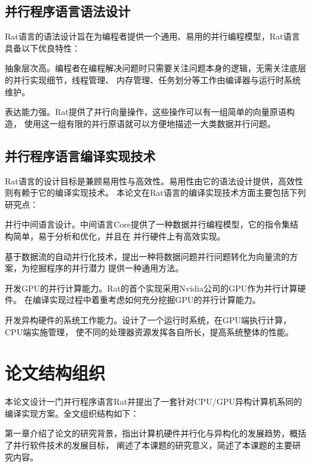 \subsection{并行程序语言语法设计}
Rat语言的语法设计旨在为编程者提供一个通用、易用的并行编程模型，Rat语言具备以下优良特性：
\begin{compactitem}
  \item 抽象层次高。编程者在编程解决问题时只需要关注问题本身的逻辑，无需关注底层的并行实现细节，线程管理、
    内存管理、任务划分等工作由编译器与运行时系统维护。
  \item 表达能力强。Rat提供了并行向量操作，这些操作可以有一组简单的向量原语构造，
    使用这一组有限的并行原语就可以方便地描述一大类数据并行问题。
\end{compactitem}

\subsection{并行程序语言编译实现技术}
Rat语言的设计目标是兼顾易用性与高效性。易用性由它的语法设计提供，高效性则有赖于它的编译实现技术。
本论文在Rat语言的编译实现技术方面主要包括下列研究点：
\begin{compactitem}
  \item 并行中间语言设计。中间语言Core提供了一种数据并行编程模型，它的指令集结构简单，易于分析和优化，并且在
    并行硬件上有高效实现。
  \item 基于数据流的自动并行化技术，提出一种将数据问题并行问题转化为向量流的方案，为挖掘程序的并行潜力
    提供一种通用方法。
  \item 开发GPU的并行计算能力。Rat的首个实现采用Nvidia公司的GPU作为并行计算硬件。
    在编译实现过程中着重考虑如何充分挖掘GPU的并行计算能力。
  \item 开发异构硬件的系统工作能力。设计了一个运行时系统，在GPU端执行计算，CPU端实施管理，
    使不同的处理器资源发挥各自所长，提高系统整体的性能。
\end{compactitem}

\section{论文结构组织}
本论文设计一门并行程序语言Rat并提出了一套针对CPU/GPU异构计算机系同的编译实现方案。全文组织结构如下：

第一章介绍了论文的研究背景，指出计算机硬件并行化与异构化的发展趋势，概括了并行软件技术的发展目标，
阐述了本课题的研究意义，简述了本课题的主要研究内容。


